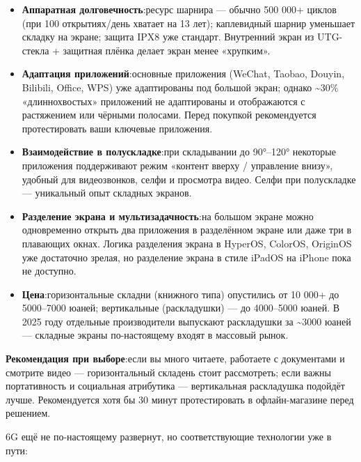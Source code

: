 \begin{itemize}
  \item \textbf{Аппаратная долговечность}:ресурс шарнира — обычно 500 000+ циклов (при 100 открытиях/день хватает на 13 лет); каплевидный шарнир уменьшает складку на экране; защита IPX8 уже стандарт. Внутренний экран из UTG-стекла + защитная плёнка делает экран менее «хрупким».
  \item \textbf{Адаптация приложений}:основные приложения (WeChat, Taobao, Douyin, Bilibili, Office, WPS) уже адаптированы под большой экран; однако \textasciitilde{}30\% «длиннохвостых» приложений не адаптированы и отображаются с растяжением или чёрными полосами. Перед покупкой рекомендуется протестировать ваши ключевые приложения.
  \item \textbf{Взаимодействие в полускладке}:при складывании до 90°–120° некоторые приложения поддерживают режим «контент вверху / управление внизу», удобный для видеозвонков, селфи и просмотра видео. Селфи при полускладке — уникальный опыт складных экранов.
  \item \textbf{Разделение экрана и мультизадачность}:на большом экране можно одновременно открыть два приложения в разделённом экране или даже три в плавающих окнах. Логика разделения экрана в HyperOS, ColorOS, OriginOS уже достаточно зрелая, но разделение экрана в стиле iPadOS на iPhone пока не доступно.
  \item \textbf{Цена}:горизонтальные складни (книжного типа) опустились от 10 000+ до 5000–7000 юаней; вертикальные (раскладушки) — до 4000–5000 юаней. В 2025 году отдельные производители выпускают раскладушки за \textasciitilde{}3000 юаней — складные экраны по-настоящему входят в массовый рынок.
\end{itemize}

\textbf{Рекомендация при выборе}:если вы много читаете, работаете с документами и смотрите видео — горизонтальный складень стоит рассмотреть; если важны портативность и социальная атрибутика — вертикальная раскладушка подойдёт лучше. Рекомендуется хотя бы 30 минут протестировать в офлайн-магазине перед решением.


6G ещё не по-настоящему развернут, но соответствующие технологии уже в пути:

